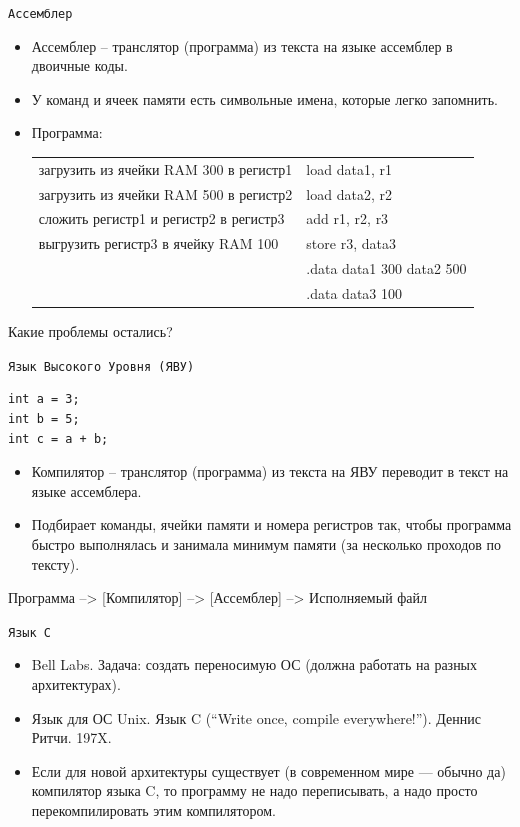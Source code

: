 \documentclass[pdf, 10pt, unicode]{beamer}
\begin{document}
\begin{frame}[fragile]{{\tt Ассемблер}}

\begin{itemize}
  \item Ассемблер -- транслятор (программа) из текста на языке ассемблер в двоичные коды.
  \item У команд и ячеек памяти есть символьные имена, которые легко запомнить.
  \item Программа:
 \begin{tabular}{ll}
    загрузить из ячейки RAM 300 в регистр1 & load data1, r1 \\
    загрузить из ячейки RAM 500 в регистр2 & load data2, r2 \\
    сложить регистр1 и регистр2 в регистр3 & add r1,  r2,  r3\\
    выгрузить регистр3 в ячейку RAM 100 & store r3, data3 \\
    & .data data1 300 data2 500\\
    & .data data3 100\\
  \end{tabular}
\end{itemize}

Какие проблемы остались? 

\end{frame}

\begin{frame}[fragile]{{\tt Язык Высокого Уровня (ЯВУ)}}
\begin{verbatim}
int a = 3;
int b = 5;
int c = a + b;
\end{verbatim}
\begin{itemize}
  \item Компилятор -- транслятор (программа) из текста на ЯВУ переводит в текст на языке ассемблера.
  \item Подбирает команды, ячейки памяти и номера регистров так, чтобы программа быстро выполнялась и занимала
  минимум памяти (за несколько проходов по тексту).
\end{itemize}
Программа --> [Компилятор] --> [Ассемблер] --> Исполняемый файл
\end{frame}

\begin{frame}[fragile]{{\tt Язык C}}

\begin{itemize}
    \item Bell Labs. Задача: создать переносимую ОС (должна работать на разных архитектурах).
    \item Язык для ОС Unix.  Язык C (``Write once, compile everywhere!''). Деннис Ритчи. 197X.
    \item Если для новой архитектуры существует (в современном мире --- обычно да) компилятор языка C,
    то программу не надо переписывать, а надо просто перекомпилировать этим компилятором.
\end{itemize}

\end{frame}
\end{document}
